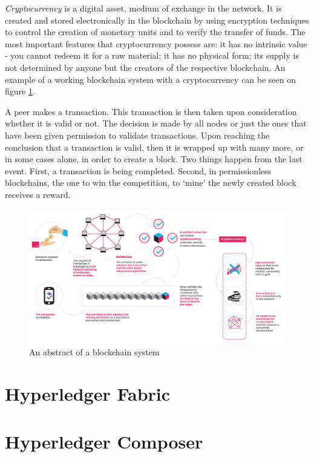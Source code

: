 \documentclass[a4paper,11pt]{report}
\begin{document}
	\textit{Cryptocurrency} is a digital asset, medium of exchange in the network. It is created and stored electronically in the blockchain by using encryption techniques to control the creation of monetary units and to verify the transfer of funds. The most important features that cryptocurrency possess are: it has no intrinsic value - you cannot redeem it for a raw material; it has no physical form; its supply is not determined by anyone but the creators of the respective blockchain. \cite{whatIsCryptocurrency}
An example of a working blockchain system with a cryptocurrency can be seen on figure \ref{blockchainAbstract}. 

A peer makes a transaction. This transaction is then taken upon consideration whether it is valid or not. The decision is made by all nodes or just the ones that have been given permission to validate transactions. Upon reaching the conclusion that a transaction is valid,  then it is wrapped up with many more, or in some cases alone, in order to create a block. Two things happen from the last event. First, a transaction is being completed. Second, in permissionless blockchains, the one to win the competition, to ‘mine’ the newly created block receives a reward. 

\begin{figure}[h]
\centering
  \includegraphics[width=16cm]{infographics0517-01-1.png}
  \caption{An abstract of a blockchain system \cite{whatIsBlockgeeks}}
  \label{blockchainAbstract}
\end{figure}


\section{Hyperledger Fabric}
\label{hplFabric}

\section{Hyperledger Composer}
\label{hplComposer}
\end{document}
